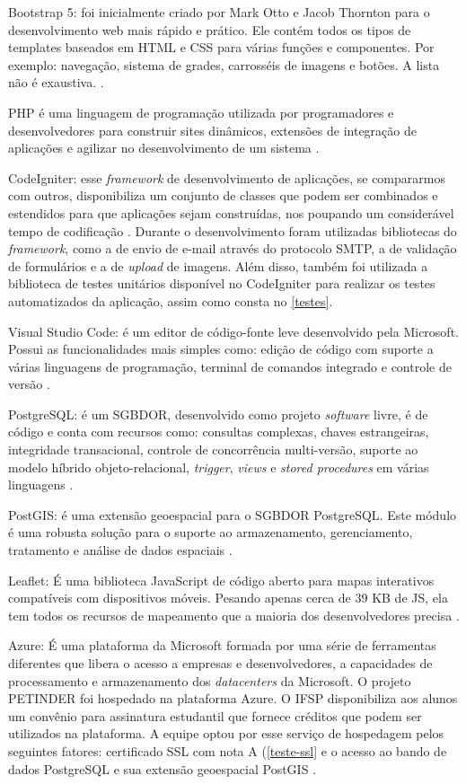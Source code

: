 Bootstrap 5: foi inicialmente criado por Mark Otto e Jacob Thornton para o desenvolvimento web mais rápido e prático. Ele contém todos os tipos de templates baseados em HTML e CSS para várias funções e componentes. Por exemplo: navegação, sistema de grades, carrosséis de imagens e botões. A lista não é exaustiva.  \cite{bootstrap}.

\ac{PHP} é uma linguagem de programação utilizada por programadores e desenvolvedores para construir sites dinâmicos, extensões de integração de aplicações e agilizar no desenvolvimento de um sistema \cite{php}.

CodeIgniter: esse \textit{framework} de desenvolvimento de aplicações, se compararmos com outros, disponibiliza um conjunto de classes que podem ser combinados e estendidos para que aplicações sejam construídas, nos poupando um considerável tempo de codificação \cite{codeigniter}.
Durante o desenvolvimento foram utilizadas bibliotecas do \textit{framework}, como a de envio de e-mail através do protocolo \ac{SMTP}, a de validação de formulários e a de \textit{upload} de imagens. Além disso, também foi utilizada a biblioteca de testes unitários disponível no \gls{CodeIgniter} para realizar os testes automatizados da aplicação, assim como consta no \autoref{testes}.

Visual Studio Code: é um editor de código-fonte leve desenvolvido pela Microsoft. Possui as funcionalidades mais simples como: edição de código com suporte a várias linguagens de programação, terminal de comandos integrado e controle de versão \cite{vscode}.

PostgreSQL: é um \ac{SGBDOR}, desenvolvido como projeto \textit{software} livre, é de código e conta com recursos como: consultas complexas, chaves estrangeiras, integridade transacional, controle de concorrência multi-versão, suporte ao modelo híbrido objeto-relacional, \textit{trigger}, \textit{views} e \textit{stored procedures} em várias linguagens \cite{postgresql}.

PostGIS: é uma extensão geoespacial para o \ac{SGBDOR} \gls{PostgreSQL}. Este módulo é uma robusta solução para o suporte ao armazenamento, gerenciamento, tratamento e análise de dados espaciais \cite{postgis}.

Leaflet: É uma biblioteca JavaScript de código aberto para mapas interativos compatíveis com dispositivos móveis. Pesando apenas cerca de 39 KB de JS, ela tem todos os recursos de mapeamento que a maioria dos desenvolvedores precisa \cite{mapa}.

Azure: É uma plataforma da Microsoft formada por uma série de ferramentas diferentes que libera o acesso a empresas e desenvolvedores, a capacidades de processamento e armazenamento dos \textit{datacenters} da Microsoft. O projeto PETINDER foi hospedado na plataforma Azure. O \ac{IFSP} disponibiliza aos alunos um convênio para assinatura estudantil que fornece créditos que podem ser utilizados na plataforma. A equipe optou por esse serviço de hospedagem pelos seguintes fatores: certificado \ac{SSL} com nota A (\autoref{teste-ssl} e o acesso ao bando de dados \gls{PostgreSQL} e sua extensão geoespacial \gls{PostGIS} \cite{azure}.

